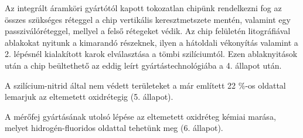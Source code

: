 Az integrált áramköri gyártótól kapott tokozatlan chipünk rendelkezni fog az összes szükséges réteggel a chip vertikális keresztmetszete mentén, valamint egy passziválóréteggel, mellyel a felső rétegeket védik. Az  chip felületén litográfiával ablakokat nyitunk a kimarandó részeknek, ilyen a hátoldali vékonyítás valamint a 2. lépésnél kialakított karok elválasztása a tömbi szilíciumtól. Ezen ablaknyitások után a chip beültethető az eddig leírt gyártástechnológiába a 4. állapot után.

A szilícium-nitrid által nem védett területeket a már említett 22 $\%$-os oldattal lemarjuk az eltemetett oxidrétegig (5. állapot).

A mérőfej gyártásának utolsó lépése az eltemetett oxidréteg kémiai marása, melyet hidrogén-fluoridos oldattal tehetünk meg (6. állapot).

